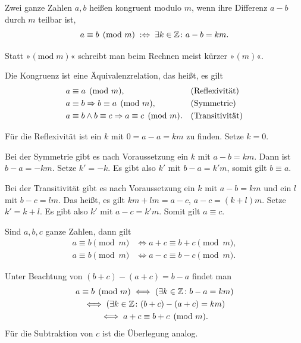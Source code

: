\begin{Definition}[Kongruenz]\newlinefirst
Zwei ganze Zahlen $a,b$ heißen kongruent modulo $m$, wenn ihre Differenz
$a-b$ durch $m$ teilbar ist,%
\[a\equiv b\pmod{m}\;:\Leftrightarrow\;\exists k\in\mathbb Z\colon a-b=km.\]
\end{Definition}
Statt »$(\mathrm{mod}\;m)$« schreibt man beim Rechnen meist
kürzer »$(m)$«.

\begin{Satz}
Die Kongruenz ist eine Äquivalenzrelation, das heißt, es gilt
\begin{align*}
&a\equiv a\pmod{m},&&\text{(Reflexivität)}\\
&a\equiv b\Rightarrow b\equiv a\pmod{m},&&\text{(Symmetrie)}\\
&a\equiv b\land b\equiv c\Rightarrow a\equiv c\pmod{m}.&&\text{(Transitivität)}
\end{align*}
\end{Satz}
\begin{Beweis}
Für die Reflexivität ist ein $k$ mit $0=a-a=km$
zu finden. Setze $k=0$.

Bei der Symmetrie gibt es nach Voraussetzung
ein $k$ mit $a-b=km$. Dann ist $b-a=-km$. Setze $k'=-k$.
Es gibt also $k'$ mit $b-a=k'm$, somit gilt $b\equiv a$.

Bei der Transitivität gibt es nach Voraussetzung ein $k$ mit
$a-b=km$ und ein $l$ mit $b-c=lm$. Das heißt, es gilt
$km+lm = a-c$,  $a-c = (k+l)m$. Setze $k'=k+l$. Es gibt also
$k'$ mit $a-c=k'm$. Somit gilt $a\equiv c$.\;\qedsymbol
\end{Beweis}

\begin{Satz}\label{Kongruenz-add-sub}
Sind $a,b,c$ ganze Zahlen, dann gilt
\begin{align*}
a\equiv b\pmod{m}&\iff a+c\equiv b+c\pmod{m},\\
a\equiv b\pmod{m}&\iff a-c\equiv b-c\pmod{m}.
\end{align*}
\end{Satz}
\begin{Beweis}
Unter Beachtung von $(b+c)-(a+c)=b-a$ findet man
\begin{gather*}
a\equiv b\pmod{m}
\iff (\exists k\in\mathbb Z\colon b-a=km)\\
\iff (\exists k\in\mathbb Z\colon (b+c)-(a+c)=km)\\
\iff a+c\equiv b+c\pmod{m}.
\end{gather*}
Für die Subtraktion von $c$ ist die Überlegung analog.\;\qedsymbol
\end{Beweis}

